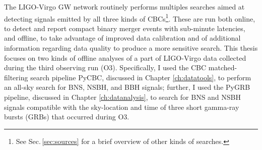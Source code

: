 \documentclass[binding=0.6cm, LaM]{sapthesis}
\begin{document}
	The LIGO-Virgo GW network routinely performs multiples searches aimed at detecting signals 
	emitted by all three kinds of CBCs\footnote{See Sec.\,\ref{sec:sources} for a brief overview of other kinds of searches.}.
        These are run both online, to detect and report compact binary merger events 
	with sub-minute latencies, and offline, to take advantage of improved data calibration 	
	and of additional information regarding data quality to produce a more sensitive search.
	This thesis focuses on two kinds of offline analyses of a part of LIGO-Virgo data collected during the third observing run (O3).
        Specifically, I used the CBC matched-filtering search pipeline {\ttfamily PyCBC}, discussed in Chapter \ref{ch:datatools}, 
	to perform an all-sky search for BNS, NSBH, and BBH signals; further, I used the {\ttfamily PyGRB} pipeline, 
	discussed in Chapter \ref{ch:datanalysis}, to search for BNS and NSBH signals compatible 
	with the sky-location and time of three short gamma-ray bursts (GRBs) that occurred during O3.
\end{document}
